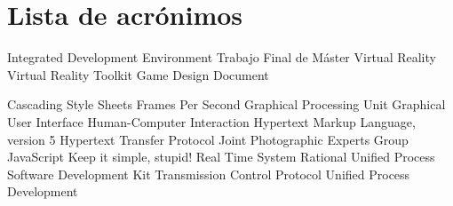 \chapter{Lista de acrónimos}
{
\small
\begin{acronym}[XXXXXXXX]

     {Integrated Development Environment}
     {Trabajo Final de Máster}
      {Virtual Reality}
    {Virtual Reality Toolkit}
     {Game Design Document}


     {Cascading Style Sheets}
     {Frames Per Second}
     {Graphical Processing Unit}
     {Graphical User Interface}  
     {Human-Computer Interaction}
   {Hypertext Markup Language, version 5}
    {Hypertext Transfer Protocol}  
    {Joint Photographic Experts Group}
      {JavaScript}
    {Keep it simple, stupid!} 
     {Real Time System}
     {Rational Unified Process}
     {Software Development Kit}
     {Transmission Control Protocol}  
     {Unified Process Development}

\end{acronym}
}




